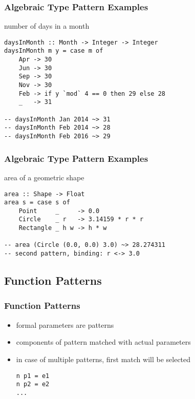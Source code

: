 \documentclass[dvipsnames]{beamer}
\theoremstyle{plain}
\begin{document}
\begin{frame}[fragile]
  \frametitle{Algebraic Type Pattern Examples}

  \begin{exampleblock}{number of days in a month}
    \begin{lstlisting}
daysInMonth :: Month -> Integer -> Integer
daysInMonth m y = case m of
    Apr -> 30
    Jun -> 30
    Sep -> 30
    Nov -> 30
    Feb -> if y `mod` 4 == 0 then 29 else 28
    _   -> 31

-- daysInMonth Jan 2014 ~> 31
-- daysInMonth Feb 2014 ~> 28
-- daysInMonth Feb 2016 ~> 29
    \end{lstlisting}
  \end{exampleblock}
\end{frame}

\begin{frame}[fragile]
  \frametitle{Algebraic Type Pattern Examples}

  \begin{exampleblock}{area of a geometric shape}
    \begin{lstlisting}
area :: Shape -> Float
area s = case s of
    Point     _     -> 0.0
    Circle    _ r   -> 3.14159 * r * r
    Rectangle _ h w -> h * w

-- area (Circle (0.0, 0.0) 3.0) ~> 28.274311
-- second pattern, binding: r <-> 3.0
    \end{lstlisting}
  \end{exampleblock}
\end{frame}

\subsection{Function Patterns}

\begin{frame}[fragile]
  \frametitle{Function Patterns}

  \begin{itemize}
    \item formal parameters are patterns
    \item components of pattern matched with actual parameters

    \medskip
    \item in case of multiple patterns, first match will be selected

    \smallskip
    \begin{lstlisting}[style=syntax]
n p1 = e1
n p2 = e2
...
    \end{lstlisting}
  \end{itemize}
\end{frame}
\end{document}
